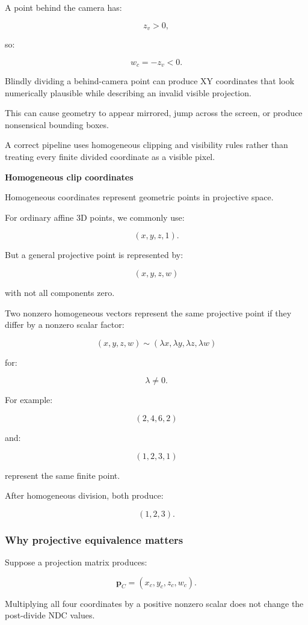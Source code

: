 A point behind the camera has:

\[
 z_v>0,
\]

so:

\[
 w_c=-z_v<0.
\]

Blindly dividing a behind-camera point can produce XY coordinates that look numerically plausible while describing an invalid visible projection.

This can cause geometry to appear mirrored, jump across the screen, or produce nonsensical bounding boxes.

A correct pipeline uses homogeneous clipping and visibility rules rather than treating every finite divided coordinate as a visible pixel.

\textbf{Homogeneous clip coordinates}

Homogeneous coordinates represent geometric points in projective space.

For ordinary affine 3D points, we commonly use:

\[
 (x,y,z,1).
\]

But a general projective point is represented by:

\[
 \boxed{ (x,y,z,w) }
\]

with not all components zero.

Two nonzero homogeneous vectors represent the same projective point if they differ by a nonzero scalar factor:

\[
 \boxed{ (x,y,z,w) \sim (\lambda x,\lambda y,\lambda z,\lambda w) }
\]

for:

\[
 \lambda\ne0.
\]

For example:

\[
 (2,4,6,2)
\]

and:

\[
 (1,2,3,1)
\]

represent the same finite point.

After homogeneous division, both produce:

\[
 (1,2,3).
\]

\subsubsection{Why projective equivalence matters}\label{why-projective-equivalence-matters}

Suppose a projection matrix produces:

\[
 \mathbf p_C=(x_c,y_c,z_c,w_c).
\]

Multiplying all four coordinates by a positive nonzero scalar does not change the post-divide NDC values.

